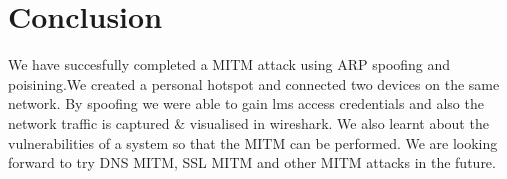 \documentclass[11pt]{article}
\begin{document}
\section{Conclusion}
We have succesfully completed a MITM attack using ARP spoofing and poisining.We created a personal hotspot and connected two devices on the same network. By spoofing we were able to gain lms access credentials and also the network traffic is captured & visualised in wireshark. We also learnt about the vulnerabilities of a system so that the MITM can be performed. We are looking forward to try DNS MITM, SSL MITM and other MITM attacks in the future.




\end{document}
